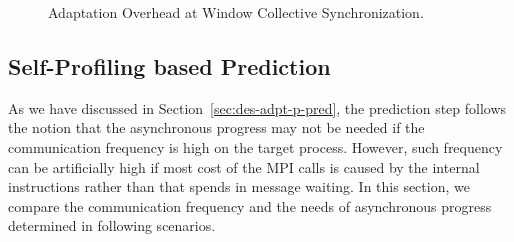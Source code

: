 \begin{figure}[ht]
\centering
{}
\caption{Adaptation Overhead at Window Collective Synchronization.}
\label{fig:eva-micro-overhead-coll}
\end{figure}


\subsection{Self-Profiling based Prediction}

As we have discussed in Section~\ref{sec:des-adpt-p-pred},
the prediction step follows the notion that the asynchronous progress may
not be needed if the communication frequency is high on the target process.
However, such frequency can be artificially high if most cost of the MPI
calls is caused by the internal instructions rather than that spends
in message waiting. In this section, we compare the communication frequency
and the needs of asynchronous progress determined in following scenarios.


